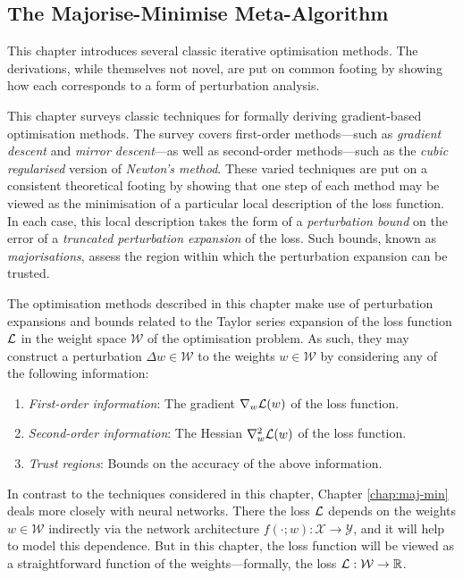 \begin{refsection}

\chapter{The Majorise-Minimise Meta-Algorithm}
\label{chap:perturb}

\begin{tcolorbox}
This chapter introduces several classic iterative optimisation methods. The derivations, while themselves not novel, are put on common footing by showing how each corresponds to a form of perturbation analysis.
\end{tcolorbox}

This chapter surveys classic techniques for formally deriving gradient-based optimisation methods. The survey covers first-order methods---such as \textit{gradient descent} and \textit{mirror descent}---as well as second-order methods---such as the \textit{cubic regularised} version of  \textit{Newton's method}. These varied techniques are put on a consistent theoretical footing by showing that one step of each method may be viewed as the minimisation of a particular local description of the loss function. In each case, this local description takes the form of a \textit{perturbation bound} on the error of a \textit{truncated perturbation expansion} of the loss. Such bounds, known as \textit{majorisations}, assess the region within which the perturbation expansion can be trusted.

The optimisation methods described in this chapter make use of perturbation expansions and bounds related to the Taylor series expansion of the loss function $\mathcal{L}$ in the weight space $\mathcal{W}$ of the optimisation problem. As such, they may construct a perturbation $\Delta w\in\mathcal{W}$ to the weights $w\in\mathcal{W}$ by considering any of the following information:
\begin{enumerate}
    \item \textit{First-order information}: The gradient $\nabla_w \mathcal{L}(w)$ of the loss function.
    \item \textit{Second-order information}: The Hessian $\nabla_w^2 \mathcal{L}(w)$ of the loss function.
    \item \textit{Trust regions}: Bounds on the accuracy of the above information.
\end{enumerate}

In contrast to the techniques considered in this chapter, Chapter \ref{chap:maj-min} deals more closely with neural networks. There the loss $\mathcal{L}$ depends on the weights $w\in\mathcal{W}$ indirectly via the network architecture $f(\cdot;w):\mathcal{X}\to\mathcal{Y}$, and it will help to model this dependence. But in this chapter, the loss function will be viewed as a straightforward function of the weights---formally, the loss $\mathcal{L} : \mathcal{W} \to \mathbb{R}$.


\end{refsection}
